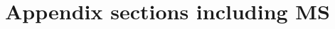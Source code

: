 \documentclass[12pt]{article}
\begin{document}
\clearpage





\clearpage
\section{Appendix sections including MS}




 \begin{table}[H]
                \centering
                \caption{Interval Model of Consumer WTP for Oranges (Baseline: BDM Real)}
                \label{tab:MSB_interval_regression_multiple_comaparisons}
\end{table}
\end{document}
